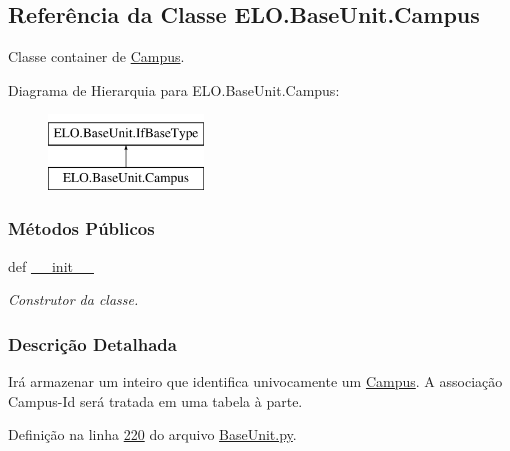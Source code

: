 \hypertarget{classELO_1_1BaseUnit_1_1Campus}{\subsection{Referência da Classe E\-L\-O.\-Base\-Unit.\-Campus}
\label{classELO_1_1BaseUnit_1_1Campus}
}


Classe container de \hyperlink{classELO_1_1BaseUnit_1_1Campus}{Campus}.  


Diagrama de Hierarquia para E\-L\-O.\-Base\-Unit.\-Campus\-:\begin{figure}[H]
\begin{center}
\leavevmode
\includegraphics[height=2.000000cm]{d4/d76/classELO_1_1BaseUnit_1_1Campus}
\end{center}
\end{figure}
\subsubsection*{Métodos Públicos}
\begin{DoxyCompactItemize}
\item 
def \hyperlink{classELO_1_1BaseUnit_1_1Campus_abd800984df4eb26836d305682d84dfa9}{\-\_\-\-\_\-init\-\_\-\-\_\-}
\begin{DoxyCompactList}\small\item\em Construtor da classe. \end{DoxyCompactList}\end{DoxyCompactItemize}


\subsubsection{Descrição Detalhada}
Irá armazenar um inteiro que identifica univocamente um \hyperlink{classELO_1_1BaseUnit_1_1Campus}{Campus}. A associação Campus-\/\-Id será tratada em uma tabela à parte. 

Definição na linha \hyperlink{BaseUnit_8py_source_l00220}{220} do arquivo \hyperlink{BaseUnit_8py_source}{Base\-Unit.\-py}.



